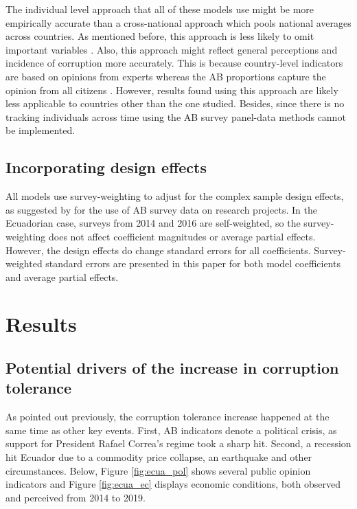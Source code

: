 \documentclass[12pt,a4]{article}\usepackage[]{graphicx}\usepackage[]{xcolor}
\begin{document}
The individual level approach that all of these models use might be more empirically accurate than a cross-national approach which pools national averages across countries. As mentioned before, this approach is less likely to omit important variables \parencite{Bergh.2017}. Also, this approach might reflect general perceptions and incidence of corruption more accurately. This is because country-level indicators are based on opinions from experts whereas the AB proportions capture the opinion from all citizens \parencite{Morris.2008}. However, results found using this approach are likely less applicable to countries other than the one studied. Besides, since there is no tracking individuals across time using the AB survey panel-data methods cannot be implemented. 

\subsection{Incorporating design effects}
All models use survey-weighting to adjust for the complex sample design effects, as suggested by \textcite{Castorena.2021} for the use of AB survey data on research projects. In the Ecuadorian case, surveys from 2014 and 2016 are self-weighted, so the survey-weighting does not affect coefficient magnitudes or average partial effects. However, the design effects do change standard errors for all coefficients. Survey-weighted standard errors are presented in this paper for both model coefficients and average partial effects. 






\section{Results}
\label{sec:findings}
\subsection{Potential drivers of the increase in corruption tolerance}
As pointed out previously, the corruption tolerance increase happened at the same time as other key events. First, AB indicators denote a political crisis, as support for President Rafael Correa's regime took a sharp hit. Second, a recession hit Ecuador due to a commodity price collapse, an earthquake and other circumstances. Below, Figure \ref{fig:ecua_pol} shows several public opinion indicators and Figure \ref{fig:ecua_ec} displays economic conditions, both observed and perceived from 2014 to 2019. 
\end{document}
